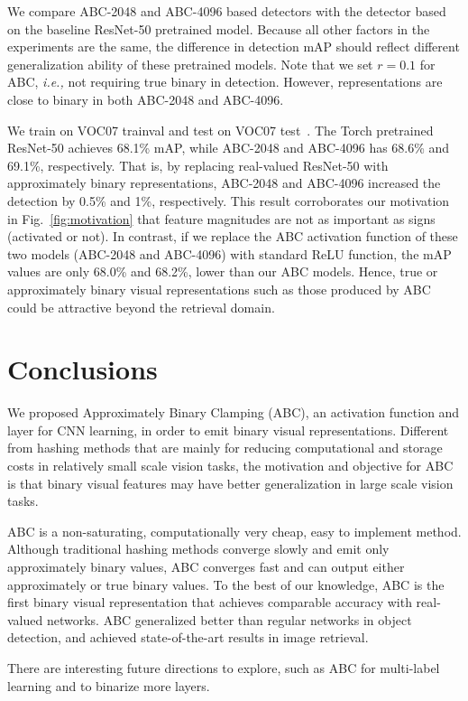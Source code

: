 \documentclass[runningheads]{llncs}
\begin{document}
We compare ABC-2048 and ABC-4096 based detectors with the detector based on the baseline ResNet-50 pretrained model. Because all other factors in the experiments are the same, the difference in detection mAP should reflect different generalization ability of these pretrained models. Note that we set $r=0.1$ for ABC, \emph{i.e.,} not requiring true binary in detection. However, representations are close to binary in both ABC-2048 and ABC-4096.

We train on VOC07 trainval and test on VOC07 test~\cite{voc07}. The Torch pretrained ResNet-50 achieves 68.1\% mAP, while ABC-2048 and ABC-4096 has 68.6\% and 69.1\%, respectively. That is, by replacing real-valued ResNet-50 with approximately binary representations, ABC-2048 and ABC-4096 increased the detection by 0.5\% and 1\%, respectively. This result corroborates our motivation in Fig.~\ref{fig:motivation} that feature magnitudes are not as important as signs (activated or not). In contrast, if we replace the ABC activation function of these two models (ABC-2048 and ABC-4096) with standard ReLU function, the mAP values are only 68.0\% and 68.2\%, lower than our ABC models. Hence, true or approximately binary visual representations such as those produced by ABC could be attractive beyond the retrieval domain.

\section{Conclusions}

We proposed Approximately Binary Clamping (ABC), an activation function and layer for CNN learning, in order to emit binary visual representations. Different from hashing methods that are mainly for reducing computational and storage costs in relatively small scale vision tasks, the motivation and objective for ABC is that  binary visual features may have better generalization in large scale vision tasks.

ABC is a non-saturating, computationally very cheap, easy to implement method. Although traditional hashing methods converge slowly and emit only approximately binary values, ABC converges fast and can output either approximately or true binary values. To the best of our knowledge, ABC is the first binary visual representation that achieves comparable accuracy with real-valued networks. ABC generalized better than regular networks in object detection, and achieved state-of-the-art results in image retrieval.

There are interesting future directions to explore, such as ABC for multi-label learning and to binarize more layers.

\clearpage



\end{document}
